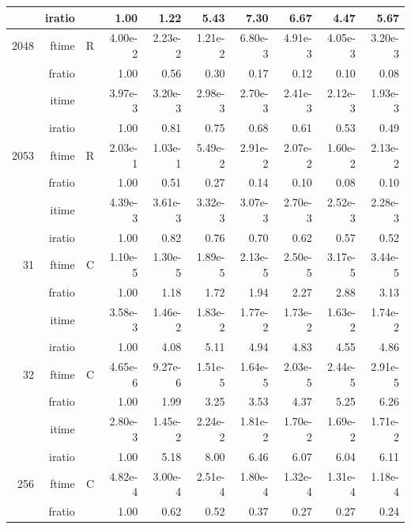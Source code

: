 \documentclass[a4paper]{article}
\begin{document}
\begin{table}
\begin{center}
\begin{tabular}{|r|r|r|r|r|r|r|r|r|r|}
     & iratio & &       1.00 &   1.22 &   5.43 &   7.30 &   6.67 &   4.47 &   5.67      \\ \hline 
  2048  & ftime & R  &  4.00e-2 &   2.23e-2 &   1.21e-2 &   6.80e-3 &   4.91e-3 &   4.05e-3 &   3.20e-3   \\ 
      & fratio & &      1.00 &   0.56 &   0.30 &   0.17 &   0.12 &   0.10 &   0.08      \\ 
     & itime & &        3.97e-3 &   3.20e-3 &   2.98e-3 &   2.70e-3 &   2.41e-3 &   2.12e-3 &   1.93e-3     \\ 
     & iratio & &       1.00 &   0.81 &   0.75 &   0.68 &   0.61 &   0.53 &   0.49       \\ \hline 
  2053  & ftime & R  &  2.03e-1 &   1.03e-1 &   5.49e-2 &   2.91e-2 &   2.07e-2 &   1.60e-2 &   2.13e-2    \\ 
      & fratio & &      1.00 &   0.51 &   0.27 &   0.14 &   0.10 &   0.08 &   0.10    \\ 
     & itime & &        4.39e-3 &   3.61e-3 &   3.32e-3 &   3.07e-3 &   2.70e-3 &   2.52e-3 &   2.28e-3      \\ 
     & iratio & &       1.00 &   0.82 &   0.76 &   0.70 &   0.62 &   0.57 &   0.52      \\ \hline \hline
    31  & ftime & C  &  1.10e-5 &   1.30e-5 &   1.89e-5 &   2.13e-5 &   2.50e-5 &   3.17e-5 &   3.44e-5    \\ 
      & fratio & &      1.00 &   1.18 &   1.72 &   1.94 &   2.27 &   2.88 &   3.13      \\ 
     & itime & &        3.58e-3 &   1.46e-2 &   1.83e-2 &   1.77e-2 &   1.73e-2 &   1.63e-2 &   1.74e-2      \\ 
     & iratio & &       1.00 &   4.08 &   5.11 &   4.94 &   4.83 &   4.55 &   4.86       \\ \hline 
    32  & ftime & C  &  4.65e-6 &   9.27e-6 &   1.51e-5 &   1.64e-5 &   2.03e-5 &   2.44e-5 &   2.91e-5    \\ 
      & fratio & &      1.00 &   1.99 &   3.25 &   3.53 &   4.37 &   5.25 &   6.26      \\ 
     & itime & &        2.80e-3 &   1.45e-2 &   2.24e-2 &   1.81e-2 &   1.70e-2 &   1.69e-2 &   1.71e-2      \\ 
     & iratio & &       1.00 &   5.18 &   8.00 &   6.46 &   6.07 &   6.04 &   6.11       \\ \hline 
   256  & ftime & C  &  4.82e-4 &   3.00e-4 &   2.51e-4 &   1.80e-4 &   1.32e-4 &   1.31e-4 &   1.18e-4    \\ 
      & fratio & &      1.00 &   0.62 &   0.52 &   0.37 &   0.27 &   0.27 &   0.24      \\ 

\end{tabular}
\end{center}
\end{table}
\end{document}
